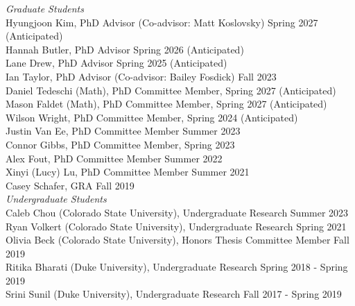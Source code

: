 \documentclass[margin,line]{res}
\begin{document}
\begin{resume}
{\em Graduate Students} \hfill \\
Hyungjoon Kim, PhD Advisor (Co-advisor: Matt Koslovsky) \hfill Spring 2027 (Anticipated) \\
Hannah Butler, PhD Advisor \hfill Spring 2026 (Anticipated) \\
Lane Drew, PhD Advisor \hfill Spring 2025 (Anticipated) \\
Ian Taylor, PhD Advisor (Co-advisor: Bailey Fosdick) \hfill Fall 2023 \\
Daniel Tedeschi (Math), PhD Committee Member, \hfill Spring 2027 (Anticipated) \\
Mason Faldet (Math), PhD Committee Member, \hfill Spring 2027 (Anticipated) \\
Wilson Wright, PhD Committee Member, \hfill Spring 2024 (Anticipated) \\
Justin Van Ee, PhD Committee Member \hfill Summer 2023 \\
Connor Gibbs, PhD Committee Member, \hfill Spring 2023  \\
Alex Fout, PhD Committee Member \hfill Summer 2022 \\
Xinyi (Lucy) Lu, PhD Committee Member \hfill Summer 2021 \\
Casey Schafer, GRA \hfill Fall 2019 \\






\vspace{-.3cm}
{\em Undergraduate Students} \hfill \\
Caleb Chou (Colorado State University), Undergraduate Research \hfill Summer 2023 \\
Ryan Volkert (Colorado State University), Undergraduate Research \hfill Spring 2021 \\
Olivia Beck (Colorado State University), Honors Thesis Committee Member \hfill Fall 2019 \\
Ritika Bharati (Duke University), Undergraduate Research \hfill Spring 2018 - Spring 2019\\
Srini Sunil (Duke University), Undergraduate Research \hfill Fall 2017 - Spring 2019



\end{resume}
\end{document}

